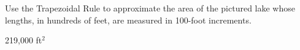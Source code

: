 {Use the Trapezoidal Rule to approximate the area of the pictured lake whose lengths, in hundreds of feet, are measured in 100-foot increments.\label{07_01_ex_29}

\begin{center}\end{center}}
{219,000 ft$^2$}
